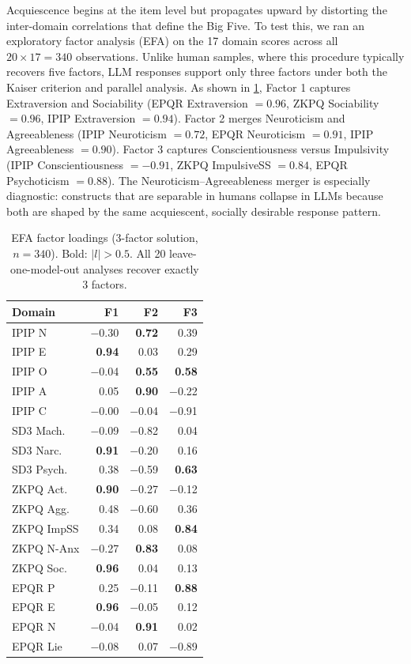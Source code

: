 \documentclass[11pt]{article}
\begin{document}
Acquiescence begins at the item level but propagates upward by distorting the inter-domain correlations that define the Big Five. To test this, we ran an exploratory factor analysis (EFA) on the 17 domain scores across all $20 \times 17 = 340$ observations. Unlike human samples, where this procedure typically recovers five factors, LLM responses support only three factors under both the Kaiser criterion and parallel analysis. As shown in \cref{tab:efa}, Factor 1 captures Extraversion and Sociability (EPQR Extraversion $= 0.96$, ZKPQ Sociability $= 0.96$, IPIP Extraversion $= 0.94$). Factor 2 merges Neuroticism and Agreeableness (IPIP Neuroticism $= 0.72$, EPQR Neuroticism $= 0.91$, IPIP Agreeableness $= 0.90$). Factor 3 captures Conscientiousness versus Impulsivity (IPIP Conscientiousness $= -0.91$, ZKPQ ImpulsiveSS $= 0.84$, EPQR Psychoticism $= 0.88$). The Neuroticism--Agreeableness merger is especially diagnostic: constructs that are separable in humans collapse in LLMs because both are shaped by the same acquiescent, socially desirable response pattern.


\begin{table}[t]
\centering
\small
\caption{EFA factor loadings (3-factor solution, $n{=}340$). Bold: $|l| > 0.5$. All 20 leave-one-model-out analyses recover exactly 3 factors.}
\label{tab:efa}
\begin{tabular}{lrrr}
\toprule
Domain & F1 & F2 & F3 \\
\midrule
IPIP N & $-$0.30 & \textbf{0.72} & 0.39 \\
IPIP E & \textbf{0.94} & 0.03 & 0.29 \\
IPIP O & $-$0.04 & \textbf{0.55} & \textbf{0.58} \\
IPIP A & 0.05 & \textbf{0.90} & $-$0.22 \\
IPIP C & $-$0.00 & $-$0.04 & $\mathbf{-}$0.91 \\
SD3 Mach. & $-$0.09 & $\mathbf{-}$0.82 & 0.04 \\
SD3 Narc. & \textbf{0.91} & $-$0.20 & 0.16 \\
SD3 Psych. & 0.38 & $\mathbf{-}$0.59 & \textbf{0.63} \\
ZKPQ Act. & \textbf{0.90} & $-$0.27 & $-$0.12 \\
ZKPQ Agg. & 0.48 & $\mathbf{-}$0.60 & 0.36 \\
ZKPQ ImpSS & 0.34 & 0.08 & \textbf{0.84} \\
ZKPQ N-Anx & $-$0.27 & \textbf{0.83} & 0.08 \\
ZKPQ Soc. & \textbf{0.96} & 0.04 & 0.13 \\
EPQR P & 0.25 & $-$0.11 & \textbf{0.88} \\
EPQR E & \textbf{0.96} & $-$0.05 & 0.12 \\
EPQR N & $-$0.04 & \textbf{0.91} & 0.02 \\
EPQR Lie & $-$0.08 & 0.07 & $\mathbf{-}$0.89 \\
\bottomrule
\end{tabular}
\end{table}
\end{document}
